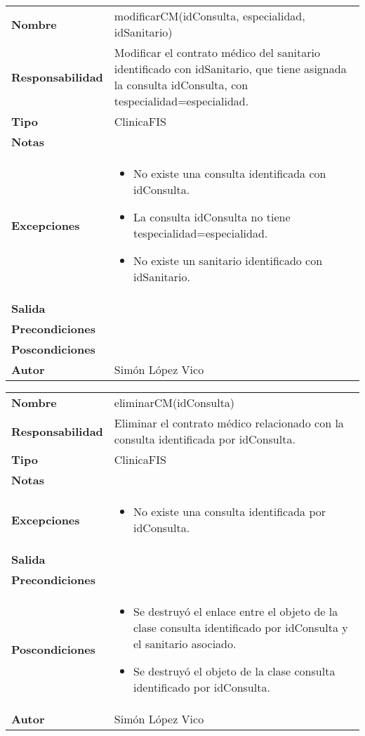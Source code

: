 \documentclass[11pt,a4paper]{article}
\begin{document}
\begin{table}[H]
	\centering
	\label{my-label}
	\begin{tabularx}{\textwidth}{l|X}
		\textbf{Nombre}          & modificarCM(idConsulta, especialidad, idSanitario) \\
		\textbf{Responsabilidad} & Modificar el contrato médico del sanitario identificado con idSanitario, que tiene asignada la consulta idConsulta, con tespecialidad=especialidad. \\
		\textbf{Tipo}            & ClinicaFIS \\
		\textbf{Notas}           &  \\
		\textbf{Excepciones}     &
		\begin{itemize}
			\item No existe una consulta identificada con idConsulta.
			\item La consulta idConsulta no tiene tespecialidad=especialidad.
			\item No existe un sanitario identificado con idSanitario. 
		\end{itemize} \\
		\textbf{Salida}          &  \\
		\textbf{Precondiciones}  &  \\
		\textbf{Poscondiciones}  &  \\
		\textbf{Autor}			 & Simón López Vico
	\end{tabularx}
\end{table}



\begin{table}[H]
	\centering
	\label{my-label}
	\begin{tabularx}{\textwidth}{l|X}
		\textbf{Nombre}          & eliminarCM(idConsulta)\\
		\textbf{Responsabilidad} & Eliminar el contrato médico relacionado con la consulta identificada por idConsulta. \\
		\textbf{Tipo}            & ClinicaFIS \\
		\textbf{Notas}           &  \\
		\textbf{Excepciones}     &
		\begin{itemize}
			\item No existe una consulta identificada por idConsulta.
		\end{itemize} \\
		\textbf{Salida}          &  \\
		\textbf{Precondiciones}  &  \\
		\textbf{Poscondiciones}  & 
		\begin{itemize}
			\item Se destruyó el enlace entre el objeto de la clase consulta identificado por idConsulta y el sanitario asociado.
			\item Se destruyó el objeto de la clase consulta identificado por idConsulta.
		\end{itemize} \\
		\textbf{Autor}			 & Simón López Vico
	\end{tabularx}
\end{table}
\end{document}
